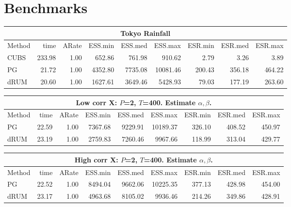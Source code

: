 \documentclass[11pt]{article}
\begin{document}
\appendix

\section{Benchmarks}

\begin{table}
\begin{tabular}{l r r r r r r r r } 
\hline
\multicolumn{9}{c}{Tokyo Rainfall} \\
\hline
          Method  &     time &    ARate &  ESS.min &  ESS.med &  ESS.max &  ESR.min &  ESR.med &  ESR.max \\ 
            CUBS  &   233.98 &     1.00 &   652.86 &   761.98 &   910.62 &     2.79 &     3.26 &     3.89 \\ 
              PG  &    21.72 &     1.00 &  4352.80 &  7735.08 & 10081.46 &   200.43 &   356.18 &   464.22 \\ 
            dRUM  &    20.60 &     1.00 &  1627.61 &  3649.46 &  5428.93 &    79.03 &   177.19 &   263.60
 \end{tabular}
\end{table}

\begin{table}
\centering
\begin{tabular}{l r r r r r r r r } 
\hline
\multicolumn{9}{c}{Low corr X: $P$=2, $T$=400.  Estimate $\alpha, \beta$.} \\
\hline
          Method  &    time &  ARate & ESS.min & ESS.med & ESS.max & ESR.min & ESR.med & ESR.max \\ 
             PG  &    22.59 &     1.00 &   7367.68 &   9229.91 &  10189.37 &    326.10 &    408.52 &    450.97 \\ 
           dRUM  &    23.19 &     1.00 &   2759.83 &   7260.46 &   9967.66 &    118.99 &    313.04 &    429.77
         \end{tabular}

\begin{tabular}{l r r r r r r r r }
\hline
\multicolumn{9}{c}{High corr X: $P$=2, $T$=400. Estimate $\alpha, \beta$.} \\
\hline 
          Method  &    time &  ARate & ESS.min & ESS.med & ESS.max & ESR.min & ESR.med & ESR.max \\ 
             PG  &    22.52 &     1.00 &   8494.04 &   9662.06 &  10225.35 &    377.13 &    428.98 &    454.00 \\ 
           dRUM  &    23.17 &     1.00 &   4963.68 &   8105.02 &   9936.46 &    214.26 &    349.86 &    428.91
\end{tabular}

\end{table}
\end{document}
